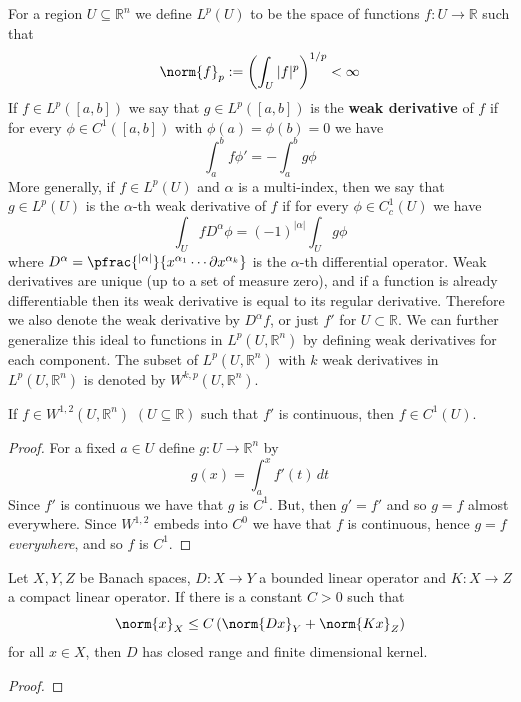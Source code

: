 For a region $U \subseteq \mathbb R^n$ we define $L^p(U)$ to be the space of functions $f : U \rightarrow \mathbb R$ such that
\[ \norm{f}_p := \left( \int_U |f|^p \right)^{1/p} < \infty \]
If $f \in L^p([a,b])$ we say that $g \in L^p([a,b])$ is the \textbf{weak derivative} of $f$ if for every $\phi \in C^1([a,b])$ with $\phi(a)=\phi(b)=0$ we have
\[ \int_a^b f\phi' = -\int_a^b g\phi \]
More generally, if $f \in L^p(U)$ and $\alpha$ is a multi-index, then we say that $g \in L^p(U)$ is the $\alpha$-th weak derivative of $f$ if for every $\phi \in C_c^1(U)$ we have
\[ \int_U f D^\alpha \phi = (-1)^{|\alpha|} \int_U g\phi \]
where $D^\alpha = \pfrac{^{|\alpha|}}{x^{\alpha_1} \cdots \partial x^{\alpha_k}}$ is the $\alpha$-th differential operator. Weak derivatives are unique (up to a set of measure zero), and if a function is already differentiable then its weak derivative is equal to its regular derivative. Therefore we also denote the weak derivative by $D^\alpha f$, or just $f'$ for $U \subset \mathbb R$. We can further generalize this ideal to functions in $L^p(U,\mathbb R^n)$ by defining weak derivatives for each component. The subset of $L^p(U,\mathbb R^n)$ with $k$ weak derivatives in $L^p(U,\mathbb R^n)$ is denoted by $W^{k,p}(U,\mathbb R^n)$. 
\begin{prop}
If $f \in W^{1,2}(U,\mathbb R^n)$ $(U \subseteq \mathbb R)$ such that $f'$ is continuous, then $f \in C^1(U)$.
\end{prop}
\begin{proof}
For a fixed $a \in U$ define $g : U \rightarrow \mathbb R^n$ by
\[ g(x) = \int_a^x f'(t) \, dt \]
Since $f'$ is continuous we have that $g$ is $C^1$. But, then $g'=f'$ and so $g=f$ almost everywhere. Since $W^{1,2}$ embeds into $C^0$ we have that $f$ is continuous, hence $g=f$ \emph{everywhere}, and so $f$ is $C^1$.
\end{proof}






\begin{lem}
Let $X,Y,Z$ be Banach spaces, $D : X \rightarrow Y$ a bounded linear operator and $K : X \rightarrow Z$ a compact linear operator. If there is a constant $C>0$ such that
\[ \norm{x}_X \leq C \left( \norm{Dx}_Y + \norm{Kx}_Z \right) \]
for all $x \in X$, then $D$ has closed range and finite dimensional kernel.
\end{lem}
\begin{proof}

\end{proof}









